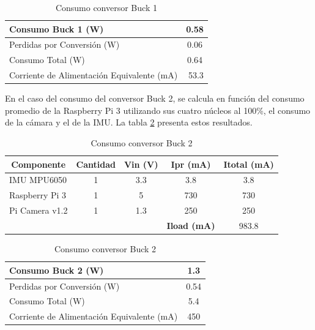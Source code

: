 \begin{table}[htbp]
	\caption{Consumo conversor Buck 1}
	\centering
	\begin{tabular}{|l|c|}
		\hline
		Consumo Buck 1 (W) & 0.58 \\ \hline
		Perdidas por Conversión (W) & 0.06 \\ \hline
		Consumo Total (W) & 0.64 \\ \hline
		Corriente de Alimentación Equivalente (mA) & \multicolumn{1}{r|}{53.3} \\ \hline
	\end{tabular}
	\label{Buck1Perdidas}
\end{table}


En el caso del consumo del conversor Buck 2, se calcula  en función del consumo promedio de la Raspberry Pi 3 utilizando sus cuatro núcleos al 100\%, el consumo de la cámara y el de la IMU. La tabla \ref{Buck2} presenta estos resultados.

\begin{table}[htbp]
	\caption{Consumo conversor Buck 2}
		\centering
	\begin{tabular}{|l|c|c|c|c|}
		\hline
		\multicolumn{1}{|c|}{\textbf{Componente}} & \textbf{Cantidad} & \textbf{ Vin (V)} & \textbf{ Ipr (mA)} & \textbf{Itotal (mA)} \\ \hline
		IMU MPU6050 & 1 & 3.3 & 3.8 & 3.8 \\ \hline
		Raspberry Pi 3  & 1 & 5 & 730 & 730 \\ \hline
		Pi Camera  v1.2 & 1 & 1.3 & 250 & 250 \\ \hline
		& \multicolumn{1}{l|}{} & \multicolumn{1}{l|}{} & \textbf{Iload (mA)} & 983.8 \\ \hline
	\end{tabular}
	\label{Buck2}
\end{table}

\begin{table}[htbp]
	\caption{Consumo conversor Buck 2}
		\centering
	\begin{tabular}{|l|c|}
		\hline
		Consumo Buck 2 (W) & 1.3 \\ \hline
		Perdidas por Conversión (W) & 0.54 \\ \hline
		Consumo Total (W) & 5.4 \\ \hline
		Corriente de Alimentación Equivalente (mA) & 450 \\ \hline
	\end{tabular}
	\label{Buck2Perdidas}
\end{table}

